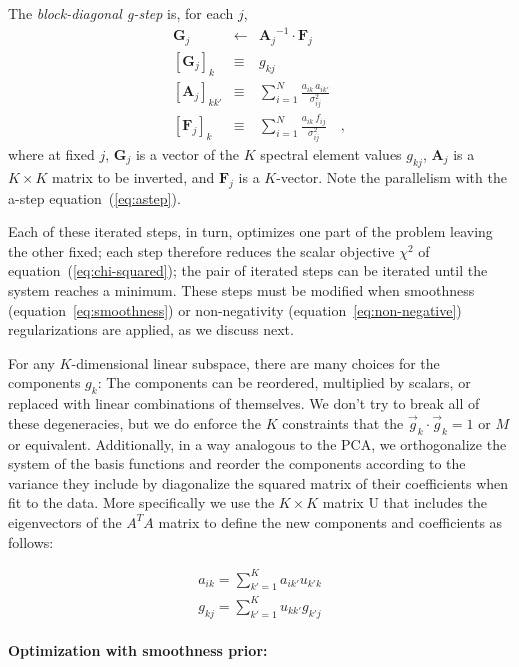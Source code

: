 \documentclass[12pt,preprint]{aastex}
\newcommand{\equationname}{equation}
\newcommand{\tv}[1]{\boldsymbol{#1}}
\newcommand{\inverse}[1]{{#1}^{-1}}
\begin{document}
The \emph{block-diagonal g-step} is, for each $j$,
\begin{eqnarray}\label{eq:gstep}\displaystyle
\tv{G}_j & \gets & \inverse{\tv{A}_j}\cdot\tv{F}_j \nonumber\\
\left[\tv{G}_j\right]_k & \equiv & g_{kj} \nonumber\\
\left[\tv{A}_j\right]_{kk'} & \equiv & \sum_{i=1}^{N} \frac{a_{ik}\,a_{ik'}}{\sigma_{ij}^2} \nonumber\\
\left[\tv{F}_j\right]_k     & \equiv & \sum_{i=1}^{N} \frac{a_{ik}\,f_{i j}}{\sigma_{ij}^2}
\quad ,
\end{eqnarray}
where at fixed $j$, $\tv{G}_j$ is a vector of the $K$ spectral element
values $g_{kj}$, $\tv{A}_j$ is a $K\times K$ matrix to be inverted, and
$\tv{F}_j$ is a $K$-vector.  Note the parallelism with the a-step
\equationname~(\ref{eq:astep}).

Each of these iterated steps, in turn, optimizes one part of the
problem leaving the other fixed; each step therefore reduces the
scalar objective $\chi^2$ of \equationname~(\ref{eq:chi-squared}); the
pair of iterated steps can be iterated until the system reaches a
minimum.  These steps must be modified when smoothness
(\equationname~\ref{eq:smoothness}) or non-negativity
(\equationname~\ref{eq:non-negative}) regularizations are applied, as
we discuss next.

For any $K$-dimensional linear subspace, there are many choices for
the components $g_k$: The components can be reordered, multiplied by
scalars, or replaced with linear combinations of themselves.  We don't
try to break all of these degeneracies, but we do enforce the $K$
constraints that the $\vec{g}_k\cdot\vec{g}_k=1$ or $M$ or equivalent.
Additionally, in a way analogous to the PCA, we orthogonalize the
system of the basis functions and reorder the components according to
the variance they include by diagonalize the squared matrix of their
coefficients when fit to the data.  More specifically we use the
$K\times K$ matrix U that includes the eigenvectors of the $A^TA$
matrix to define the new components and coefficients as follows:

\begin{eqnarray}\label{eq:ordering}
a_{ik}=\sum_{k'=1}^{K}a_{ik'}u_{k'k} \nonumber\\
g_{kj}=\sum_{k'=1}^{K}u_{kk'}g_{k'j}
\end{eqnarray}

\paragraph{Optimization with smoothness prior:}
\end{document}
